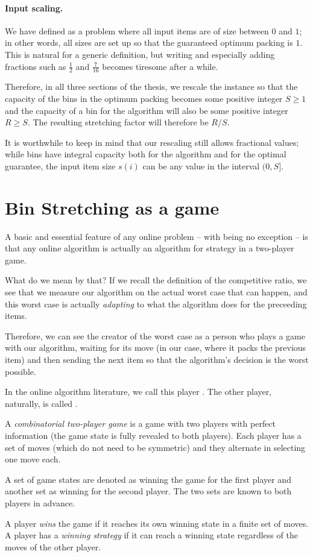\paragraph{Input scaling.} We have defined \binstretch as a problem
where all input items are of size between $0$ and $1$; in other words,
all sizes are set up so that the guaranteed optimum packing is $1$.
This is natural for a generic definition, but writing and especially
adding fractions such as $\frac{1}{2}$ and $\frac{7}{16}$ becomes
tiresome after a while.

Therefore, in all three sections of the thesis, we rescale the
instance so that the capacity of the bins in the optimum packing
becomes some positive integer $S \ge 1$ and the capacity of a bin for
the algorithm will also be some positive integer $R \ge S$. The
resulting stretching factor will therefore be $R/S$.

It is worthwhile to keep in mind that our rescaling still allows
fractional values; while bins have integral capacity both for the
algorithm and for the optimal guarantee, the input item size $s(i)$
can be any value in the interval $(0,S]$.

\section{Bin Stretching as a game}\label{sec:1:game}

A basic and essential feature of any online problem -- with
\binstretch being no exception -- is that any online algorithm is
actually an algorithm for strategy in a two-player game.

What do we mean by that? If we recall the definition of the
competitive ratio, we see that we measure our algorithm on the actual
worst case that can happen, and this worst case is actually
\emph{adapting} to what the algorithm does for the preceeding items.

Therefore, we can see the creator of the worst case as a person who
plays a game with our algorithm, waiting for its move (in our case,
where it packs the previous item) and then sending the next item so
that the algorithm's decision is the worst possible.

In the online algorithm literature, we call this player
\adversary. The other player, naturally, is called \algo.

\begin{dfn} 
A \emph{combinatorial two-player game} is a game with two
players with perfect information (the game state is fully revealed to
both players). Each player has a set of moves (which do not need to
be symmetric) and they alternate in selecting one move each.

A set of game states are denoted as winning the game for the first
player and another set as winning for the second player. The two sets
are known to both players in advance.

A player \emph{wins} the game if it reaches its own winning state in a
finite set of moves. A player has a \emph{winning strategy} if
it can reach a winning state regardless of the moves of the other
player.
\end{dfn}

